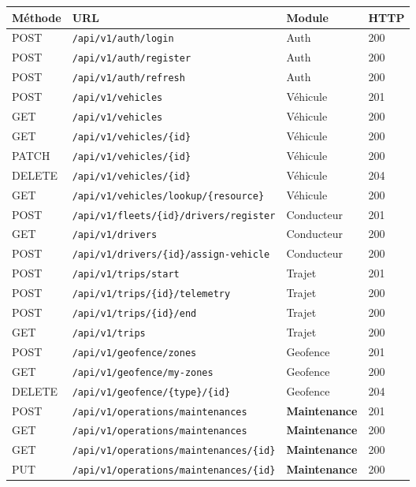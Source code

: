 \documentclass[12pt,a4paper]{report}
\begin{document}
\begin{longtable}{p{1.5cm}p{7cm}p{2.5cm}p{1.5cm}}
\toprule
\textbf{Méthode} & \textbf{URL} & \textbf{Module} & \textbf{HTTP} \\
\midrule
\endhead
POST & \texttt{/api/v1/auth/login} & Auth & 200 \\
POST & \texttt{/api/v1/auth/register} & Auth & 200 \\
POST & \texttt{/api/v1/auth/refresh} & Auth & 200 \\
POST & \texttt{/api/v1/vehicles} & Véhicule & 201 \\
GET & \texttt{/api/v1/vehicles} & Véhicule & 200 \\
GET & \texttt{/api/v1/vehicles/\{id\}} & Véhicule & 200 \\
PATCH & \texttt{/api/v1/vehicles/\{id\}} & Véhicule & 200 \\
DELETE & \texttt{/api/v1/vehicles/\{id\}} & Véhicule & 204 \\
GET & \texttt{/api/v1/vehicles/lookup/\{resource\}} & Véhicule & 200 \\
POST & \texttt{/api/v1/fleets/\{id\}/drivers/register} & Conducteur & 201 \\
GET & \texttt{/api/v1/drivers} & Conducteur & 200 \\
POST & \texttt{/api/v1/drivers/\{id\}/assign-vehicle} & Conducteur & 200 \\
POST & \texttt{/api/v1/trips/start} & Trajet & 201 \\
POST & \texttt{/api/v1/trips/\{id\}/telemetry} & Trajet & 200 \\
POST & \texttt{/api/v1/trips/\{id\}/end} & Trajet & 200 \\
GET & \texttt{/api/v1/trips} & Trajet & 200 \\
POST & \texttt{/api/v1/geofence/zones} & Geofence & 201 \\
GET & \texttt{/api/v1/geofence/my-zones} & Geofence & 200 \\
DELETE & \texttt{/api/v1/geofence/\{type\}/\{id\}} & Geofence & 204 \\
POST & \texttt{/api/v1/operations/maintenances} & \textbf{Maintenance} & 201 \\
GET & \texttt{/api/v1/operations/maintenances} & \textbf{Maintenance} & 200 \\
GET & \texttt{/api/v1/operations/maintenances/\{id\}} & \textbf{Maintenance} & 200 \\
PUT & \texttt{/api/v1/operations/maintenances/\{id\}} & \textbf{Maintenance} & 200 \\

\end{longtable}
\end{document}
